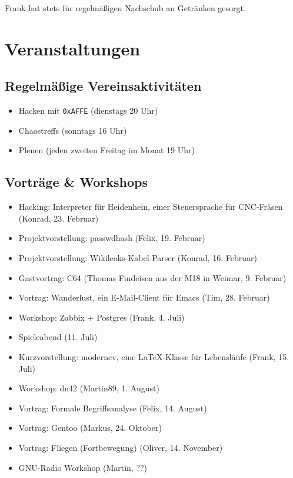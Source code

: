 \documentclass[10pt,DIV16]{scrartcl}
\begin{document}
Frank hat stets für regelmäßigen Nachschub an Getränken gesorgt.

\section{Veranstaltungen}

\subsection{Regelmäßige Vereinsaktivitäten}

\begin{itemize}
	\item Hacken mit \texttt{0xAFFE} (dienstags 20 Uhr)
	\item Chaostreffs (sonntags 16 Uhr)
	\item Plenen (jeden zweiten Freitag im Monat 19 Uhr)
\end{itemize}

\subsection{Vorträge \& Workshops}

\begin{itemize}
	\item Hacking:  Interpreter für Heidenhein, einer Steuersprache für CNC-Fräsen (Konrad, 23. Februar)
	\item Projektvorstellung:  passwdhash (Felix, 19. Februar)
	\item Projektvorstellung:  Wikileaks-Kabel-Parser (Konrad, 16. Februar)
	\item Gastvortrag:  C64 (Thomas Findeisen aus der M18 in Weimar, 9. Februar)
	\item Vortrag:  Wanderlust, ein E-Mail-Client für Emacs (Tim, 28. Februar)
	\item Workshop:  Zabbix + Postgres (Frank, 4. Juli)
	\item Spieleabend (11. Juli)
	\item Kurzvorstellung: moderncv, eine \LaTeX-Klasse für Lebensläufe (Frank, 15. Juli)
	\item Workshop:  dn42 (Martin89, 1. August)
	\item Vortrag:  Formale Begriffsanalyse (Felix, 14. August)
	\item Vortrag:  Gentoo (Markus, 24. Oktober)
	\item Vortrag:  Fliegen (Fortbewegung) (Oliver, 14. November)
	\item GNU-Radio Workshop (Martin, ??)
\end{itemize}
\end{document}
